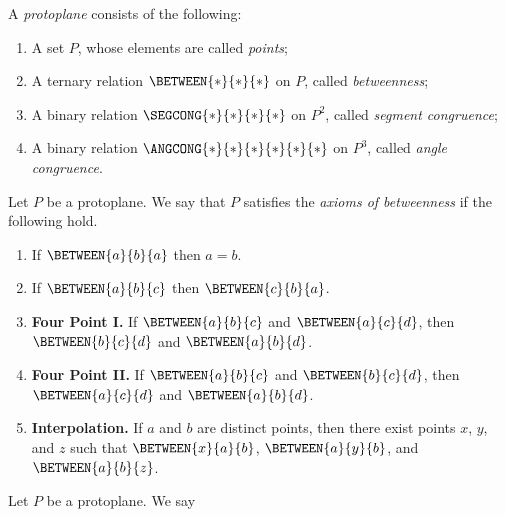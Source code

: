 \begin{dfn}[Protoplane]
A \emph{protoplane} consists of the following:
\begin{enumerate}
\item A set $P$, whose elements are called \emph{points};
\item A ternary relation $\BETWEEN{\ast}{\ast}{\ast}$ on $P$, called \emph{betweenness};
\item A binary relation $\SEGCONG{\ast}{\ast}{\ast}{\ast}$ on $P^2$, called \emph{segment congruence};
\item A binary relation $\ANGCONG{\ast}{\ast}{\ast}{\ast}{\ast}{\ast}$ on $P^3$, called \emph{angle congruence}.
\end{enumerate}
\end{dfn}


\begin{dfn}
Let $P$ be a protoplane.
We say that $P$ satisfies the \emph{axioms of betweenness} if the following hold.
\begin{enumerate}
\item If $\BETWEEN{a}{b}{a}$ then $a = b$.
\item If $\BETWEEN{a}{b}{c}$ then $\BETWEEN{c}{b}{a}$.
\item \textbf{Four Point I.} If $\BETWEEN{a}{b}{c}$ and $\BETWEEN{a}{c}{d}$, then $\BETWEEN{b}{c}{d}$ and $\BETWEEN{a}{b}{d}$.
\item \textbf{Four Point II.} If $\BETWEEN{a}{b}{c}$ and $\BETWEEN{b}{c}{d}$, then $\BETWEEN{a}{c}{d}$ and $\BETWEEN{a}{b}{d}$.
\item \textbf{Interpolation.} If $a$ and $b$ are distinct points, then there exist points $x$, $y$, and $z$ such that $\BETWEEN{x}{a}{b}$, $\BETWEEN{a}{y}{b}$, and $\BETWEEN{a}{b}{z}$.
\end{enumerate}
\end{dfn}


\begin{dfn}
Let $P$ be a protoplane.
We say
\end{dfn}
